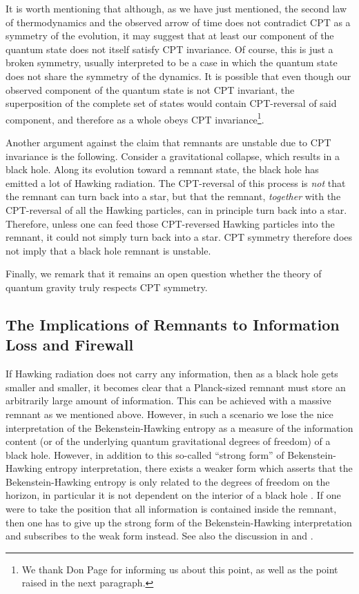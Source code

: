\documentclass[12pt]{article}
\newcommand{\2}{$^2$}
\newcommand{\3}{$^3$}
\newcommand{\4}{$_4$}
\newcommand{\5}{$_5$}
\begin{document}
{\color{black}It is worth mentioning that although, as we have just mentioned, the second law of thermodynamics and the observed arrow
of time does not contradict CPT as a symmetry of the evolution, it may 
suggest that at least our component of the quantum state does not
itself satisfy CPT invariance.  Of course, this is just a broken
symmetry, usually interpreted to be a case in which the quantum state
does not share the symmetry of the dynamics. It is possible that even though our observed component of the quantum state is not CPT invariant, the superposition of the complete set of states would contain CPT-reversal of said component, and therefore as a whole obeys CPT invariance\footnote{\color{black}We thank Don Page for informing us about this point, as well as the point raised in the next paragraph.}. }

{\color{black}Another argument against the claim that remnants are unstable due to CPT invariance is the following. Consider a gravitational collapse, which results in a black hole. Along its evolution toward a remnant state, the black hole has emitted a lot of Hawking radiation. The CPT-reversal of this process is \emph{not} that the remnant can turn back into a star, but that the remnant, \emph{together} with the CPT-reversal of all the Hawking particles, can in principle turn back into a star. Therefore, unless one can feed those CPT-reversed Hawking particles into the remnant, it could not simply turn back into a star. CPT symmetry therefore does not imply that a black hole remnant is unstable.

Finally, we remark that it remains an open question whether the theory of quantum gravity truly respects CPT symmetry.}

\subsection{The Implications of Remnants to Information Loss and Firewall}\label{3.3}

If Hawking radiation does not carry any information, then as a black hole gets smaller and smaller, it becomes clear that a Planck-sized remnant must store an arbitrarily large amount of information. This can be achieved with a massive remnant as we mentioned above. However, in such a scenario we lose the nice interpretation of the Bekenstein-Hawking entropy as a measure of the information content (or of the underlying quantum gravitational degrees of freedom) of a black hole. However, in addition to this so-called ``strong form'' of Bekenstein-Hawking entropy interpretation, there exists a weaker form which asserts that the Bekenstein-Hawking entropy is only related to the degrees of freedom on the horizon, in particular it is not dependent on the interior of a black hole \cite{sabine, Smolin-1}. If one were to take the position that all information is contained inside the remnant, then one has to give up the strong form of the Bekenstein-Hawking interpretation and subscribes to the weak form instead. See also the discussion in \cite{inout} and \cite{marolf}.  
\end{document}
